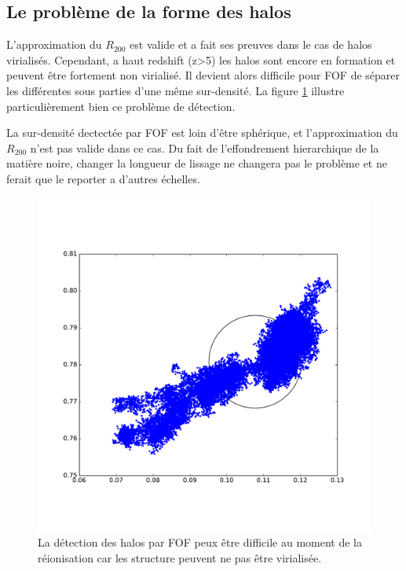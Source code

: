 \subsection{Le problème de la forme des halos}


L'approximation du $R_{200}$ est valide et a fait ses preuves dans le cas de halos virialisés.  %
Cependant, a haut redshift (z>5) les halos sont encore en formation et peuvent être fortement non virialisé.
Il devient alors difficile pour FOF de séparer les différentes sous parties d'une même sur-densité.
La figure \ref{fig:part_halo} illustre particulièrement bien ce problème de détection.

La sur-densité dectectée par FOF est loin d'être sphérique, et l'approximation du $R_{200}$ n'est pas valide dans ce cas.
Du fait de l'effondrement hierarchique de la matière noire, changer la longueur de lissage ne changera pas le problème et ne ferait que le reporter a d'autres échelles.


\begin{figure}[bth]
        \includegraphics[width=.95\textwidth]{img/03/part_halo_R200.pdf} 
        \caption{La détection des halos par FOF peux être difficile au moment de la réionisation car les structure peuvent ne pas être virialisée.
        }
 		\label{fig:part_halo}
\end{figure}


